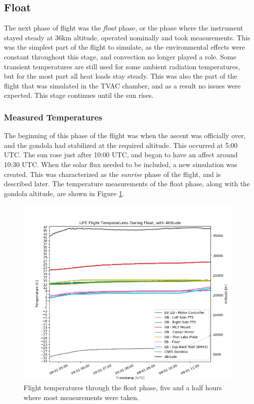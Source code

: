 \subsection{Float}
The next phase of flight was the \textit{float} phase, or the phase where the instrument stayed steady at 36km altitude, operated nominally and took measurements. This was the simplest part of the flight to simulate, as the environmental effects were constant throughout this stage, and convection no longer played a role. Some transient temperatures are still used for some ambient radiation temperatures, but for the most part all heat loads stay steady. This was also the part of the flight that was simulated in the TVAC chamber, and as a result no issues were expected. This stage continues until the sun rises.

\subsubsection{Measured Temperatures}
The beginning of this phase of the flight was when the ascent was officially over, and the gondola had stabilized at the required altitude. This occurred at 5:00 UTC. The sun rose just after 10:00 UTC, and began to have an affect around 10:30 UTC. When the solar flux needed to be included, a new simulation was created. This was characterized as the \textit{sunrise} phase of the flight, and is described later. The temperature measurements of the float phase, along with the gondola altitude, are shown in Figure \ref{fig:float_temps_no_sims}.

\begin{figure}
    \centering
    \includegraphics[width=\textwidth]{chap4_images/float_images/Float_temps_no_sims_V2.png}
    \caption{Flight temperatures through the float phase, five and a half hours where most measurements were taken.}
    \label{fig:float_temps_no_sims}
\end{figure}

